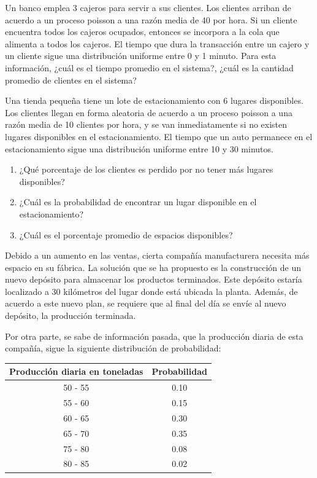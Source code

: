 \documentclass[11pt,letterpaper]{report}
\begin{document}
\begin{description}[leftmargin=1.2cm,style=nextline]
\item[5.13.] Un banco emplea 3 cajeros para servir a sus clientes. Los
clientes arriban de acuerdo a un proceso poisson a una razón media de 40 por
hora. Si un cliente encuentra todos los cajeros ocupados, entonces se
incorpora a la cola que alimenta a todos los cajeros. El tiempo que dura la
transacción entre un cajero y un cliente sigue una distribución uniforme
entre 0 y 1 minuto. Para esta información, ¿cuál es el tiempo promedio en el
sistema?, ¿cuál es la cantidad promedio de clientes en el sistema?

\item[5.14.] Una tienda pequeña tiene un lote de estacionamiento con 6
lugares disponibles. Los clientes llegan en forma aleatoria de acuerdo a un
proceso poisson a una razón media de 10 clientes por hora, y se van
inmediatamente si no existen lugares disponibles en el estacionamiento. El
tiempo que un auto permanece en el estacionamiento sigue una distribución
uniforme entre 10 y 30 minutos.
\begin{enumerate}[label=\alph*)]
\item ¿Qué porcentaje de los clientes es perdido por no tener más lugares
disponibles?
\item ¿Cuál es la probabilidad de encontrar un lugar disponible en el
estacionamiento?
\item ¿Cuál es el porcentaje promedio de espacios disponibles?
\end{enumerate}

\item[5.15.] Debido a un aumento en las ventas, cierta compañía manufacturera
necesita más espacio en su fábrica. La solución que se ha propuesto es la
construcción de un nuevo depósito para almacenar los productos terminados.
Este depósito estaría localizado a 30 kilómetros del lugar donde está ubicada
la planta. Además, de acuerdo a este nuevo plan, se requiere que al final del
día se envíe al nuevo depósito, la producción terminada.

Por otra parte, se sabe de información pasada, que la producción diaria de
esta compañía, sigue la siguiente distribución de probabilidad:

\begin{center}
\begin{tabular}{cc}
Producción diaria en toneladas & Probabilidad \\
\midrule
50 - 55 & 0.10 \\
55 - 60 & 0.15 \\
60 - 65 & 0.30 \\
65 - 70 & 0.35 \\
75 - 80 & 0.08 \\
80 - 85 & 0.02 \\
\end{tabular}
\end{center}


\end{description}
\end{document}
